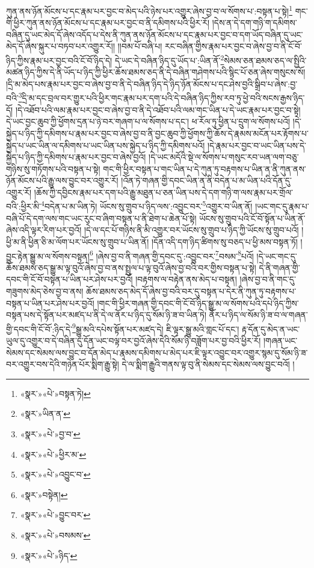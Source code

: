 ཀུན་ནས་ཉོན་མོངས་པ་དང་རྣམ་པར་བྱང་བ་མེད་པའི་ཉེས་པར་འགྱུར་ཞེས་བྱ་བ་ལ་སོགས་པ་:བསྟན་པ་སྟེ།\footnote{«སྣར་»«པེ་»བསྟན་ཏེ།} གང་གི་ཕྱིར་ཀུན་ནས་ཉོན་མོངས་པ་དང་རྣམ་པར་བྱང་བ་ནི་དམིགས་པའི་ཕྱིར་རོ། །དེས་ན་དེ་དག་གཉི་ག་དམིགས་བཞིན་དུ་ཡང་མེད་དོ་ཞེས་འདོད་པ་དེས་ནི་ཀུན་ནས་ཉོན་མོངས་པ་དང་རྣམ་པར་བྱང་བ་དག་ཡོད་བཞིན་དུ་ཡང་མེད་དོ་ཞེས་སྐུར་པ་བཏབ་པར་འགྱུར་རོ།། །།བམ་པོ་བཞི་པ། རང་བཞིན་གྱིས་རྣམ་པར་བྱང་བ་ཞེས་བྱ་བ་ནི་ངོ་བོ་ཉིད་ཀྱིས་རྣམ་པར་བྱང་བའི་ངོ་བོ་ཉིད་དེ། དེ་ཡང་དེ་བཞིན་ཉིད་དུ་ཡོད་པ་:ཡིན་ནོ་\footnote{«སྣར་»ཡིན་ན་}སེམས་ཅན་ཐམས་ཅད་ལ་སྤྱིའི་མཚན་ཉིད་ཀྱིས་དེ་ནི་ཡོད་པ་ཉིད་ཀྱི་ཕྱིར་ཆོས་ཐམས་ཅད་ནི་དེ་བཞིན་གཤེགས་པའི་སྙིང་པོ་ཅན་ཞེས་གསུངས་སོ། །དྲི་མ་མེད་པས་རྣམ་པར་བྱང་བ་ཞེས་བྱ་བ་ནི་དེ་བཞིན་ཉིད་དེ་ཉིད་ཉོན་མོངས་པ་དང་ཤེས་བྱའི་སྒྲིབ་པ་ཞེས་:བྱ་བའི་\footnote{«སྣར་»«པེ་»བྱ་བ་}དྲི་མ་དང་བྲལ་བར་གྱུར་པའི་ཕྱིར་གང་རྣམ་པར་དག་པའི་དེ་བཞིན་ཉིད་ཀྱིས་རབ་ཏུ་ཕྱེ་བའི་སངས་རྒྱས་ཉིད་དོ། །དེ་འཐོབ་པའི་ལམ་རྣམ་པར་བྱང་བ་ཞེས་བྱ་བ་ནི་དེ་འཐོབ་པའི་ལམ་གང་ཡིན་པ་དེ་ཡང་རྣམ་པར་བྱང་བ་སྟེ། དེ་ཡང་བྱང་ཆུབ་ཀྱི་ཕྱོགས་དྲན་པ་ཉེ་བར་གཞག་པ་ལ་སོགས་པ་དང་། ཕ་རོལ་ཏུ་ཕྱིན་པ་དྲུག་ལ་སོགས་པའོ། །དེ་སྐྱེད་པ་ཉིད་ཀྱི་དམིགས་པ་རྣམ་པར་བྱང་བ་ཞེས་བྱ་བ་ནི་བྱང་ཆུབ་ཀྱི་ཕྱོགས་ཀྱི་ཆོས་དེ་རྣམས་མངོན་པར་རྟོགས་པ་སྐྱེད་པ་ཡང་ཡིན་ལ་དམིགས་པ་ཡང་ཡིན་པས་སྐྱེད་པ་ཉིད་ཀྱི་དམིགས་པའོ། །དེ་རྣམ་པར་བྱང་བ་ཡང་ཡིན་པས་དེ་སྐྱེད་པ་ཉིད་ཀྱི་དམིགས་པ་རྣམ་པར་བྱང་བ་ཞེས་བྱའོ། །དེ་ཡང་མདོའི་སྡེ་ལ་སོགས་པ་གསུང་རབ་ཡན་ལག་བཅུ་གཉིས་སུ་གཏོགས་པའི་བསྟན་པ་སྟེ། གང་གི་ཕྱིར་བསྟན་པ་གང་ཡིན་པ་དེ་ཀུན་ཏུ་བརྟགས་པ་ཡིན་ན་ནི་ཀུན་ནས་ཉོན་མོངས་པའི་རྒྱུ་ལས་བྱུང་བར་འགྱུར་རོ། །འོན་ཏེ་གཞན་གྱི་དབང་ཡིན་ན་ནི་བདེན་པ་མ་ཡིན་པའི་དོན་དུ་འགྱུར་རོ། །ཆོས་ཀྱི་དབྱིངས་རྣམ་པར་དག་པའི་རྒྱུ་མཐུན་པ་ཅན་ཡིན་པས་དེ་དག་གཉི་ག་ལས་རྣམ་པར་གྲོལ་བའི་:ཕྱིར་མི་\footnote{«སྣར་»«པེ་»ཕྱིར་མ་}བདེན་པ་མ་ཡིན་ཏེ། ཡོངས་སུ་གྲུབ་པ་ཉིད་ལས་:འབྱུང་བར་\footnote{«སྣར་»«པེ་»འབྱུང་བ་}འགྱུར་བ་ཡིན་ནོ། །ཡང་གང་དུ་རྣམ་པ་བཞི་པོ་དེ་དག་ལས་གང་ཡང་རུང་བ་ཞིག་བསྟན་པ་ནི་ཐེག་པ་ཆེན་པོ་སྟེ། ཡོངས་སུ་གྲུབ་པའི་ངོ་བོ་སྟོན་པ་ཡིན་ནོ་ཞེས་འདི་ལྟར་རིག་པར་བྱའོ། །དེ་ལ་དང་པོ་གཉིས་ནི་མི་འགྱུར་བར་ཡོངས་སུ་གྲུབ་པ་ཉིད་ཀྱི་ཡོངས་སུ་གྲུབ་པའོ། །ཕྱི་མ་ནི་ཕྱིན་ཅི་མ་ལོག་པར་ཡོངས་སུ་གྲུབ་པ་ཡིན་ནོ། །དོན་འདི་དག་ཉིད་ཚིགས་སུ་བཅད་པ་ཕྱི་མས་བསྟན་ཏོ། །བྱུང་རྟེན་སྒྱུ་མ་ལ་སོགས་བསྟན།\footnote{«སྣར་»བསྟེན།} །ཞེས་བྱ་བ་ནི་གཞན་གྱི་དབང་དུ་:འབྱུང་བར་\footnote{«སྣར་»«པེ་»བྱུང་བར་}བསམ་\footnote{«སྣར་»«པེ་»བསམས་}པའོ། །དེ་ཡང་གང་དུ་ཆོས་ཐམས་ཅད་སྒྱུ་མ་ལྟ་བུའོ་ཞེས་བྱ་བ་ནས་སྤྲུལ་པ་ལྟ་བུའོ་ཞེས་བྱ་བའི་བར་གྱིས་བསྟན་པ་སྟེ། དེ་ནི་གཞན་གྱི་དབང་གི་ངོ་བོ་བསྟན་པ་ཡིན་པར་ཤེས་པར་བྱའོ། །བརྟགས་ལ་བརྟེན་ནས་མེད་པ་བསྟན། །ཞེས་བྱ་བ་ནི་གང་དུ་གཟུགས་མེད་ཅེས་བྱ་བ་ནས། ཆོས་ཐམས་ཅད་མེད་དོ་ཞེས་བྱ་བའི་བར་དུ་བསྟན་པ་དེར་ནི་ཀུན་ཏུ་བརྟགས་པ་བསྟན་པ་ཡིན་པར་ཤེས་པར་བྱའོ། །གང་གི་ཕྱིར་གཞན་གྱི་དབང་གི་ངོ་བོ་ཉིད་སྒྱུ་མ་ལ་སོགས་པའི་དཔེ་ཉིད་ཀྱིས་བསྟན་པས་དེ་སྟོན་པར་མཛད་པ་ནི་དེ་ལ་ནོར་པ་ཉིད་དུ་སོམ་ཉི་ཟ་བ་ཡིན་ཏེ། ནོར་པ་ཉིད་ལ་སོམ་ཉི་ཟ་བ་ལ་གཞན་གྱི་དབང་གི་ངོ་བོ་:ཉིད་དེ་\footnote{«སྣར་»«པེ་»ཉིད་}སྒྱུ་མའི་དཔེས་སྟོན་པར་མཛད་དེ། ཇི་ལྟར་སྒྱུ་མའི་གླང་པོ་དང་། རྟ་དོན་དུ་མེད་ན་ཡང་ཡུལ་དུ་འགྱུར་བ་དེ་བཞིན་དུ་དོན་ཡང་བལྟ་བར་བྱའོ་ཞེས་དེའི་སོམ་ཉི་བཟློག་པར་བྱ་བའི་ཕྱིར་རོ། །གཞན་ཡང་སེམས་དང་སེམས་ལས་བྱུང་བ་དོན་མེད་པ་རྣམས་དམིགས་པ་མེད་པར་ཇི་ལྟར་འབྱུང་བར་འགྱུར་སྙམ་དུ་སོམ་ཉི་ཟ་བར་འགྱུར་བས་དེའི་གཉེན་པོར་སྨིག་རྒྱུ་སྟེ། དེ་ལ་སྨིག་རྒྱུའི་གནས་ལྟ་བུ་ནི་སེམས་དང་སེམས་ལས་བྱུང་བའོ། །
